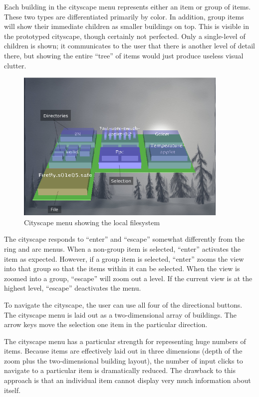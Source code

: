 \documentclass[letterpaper, titlepage, 11pt]{article}
\begin{document}
Each building in the cityscape menu represents either an item or group of
items.  These two types are differentiated primarily by color.  In addition,
group items will show their immediate children as smaller buildings on top.
This is visible in the prototyped cityscape, though certainly not perfected.
Only a single-level of children is shown; it communicates to the user that
there is another level of detail there, but showing the entire ``tree'' of
items would just produce useless visual clutter.

\begin{figure}[htb]
\centering
\includegraphics[width=4in]{figures/city_menu}
\caption{Cityscape menu showing the local filesystem\label{figure:CityscapeMenu}}
\end{figure}

The cityscape responds to ``enter'' and ``escape'' somewhat differently from
the ring and arc menus.  When a non-group item is selected, ``enter'' activates
the item as expected.  However, if a group item is selected, ``enter'' zooms
the view into that group so that the items within it can be selected.  When
the view is zoomed into a group, ``escape'' will zoom out a level.  If the
current view is at the highest level, ``escape'' deactivates the menu.

To navigate the cityscape, the user can use all four of the directional buttons.
The cityscape menu is laid out as a two-dimensional array of buildings.
The arrow keys move the selection one item in the particular direction.

The cityscape menu has a particular strength for representing huge numbers of
items.  Because items are effectively laid out in three dimensions (depth
of the zoom plus the two-dimensional building layout), the number of input
clicks to navigate to a particular item is dramatically reduced.  The drawback
to this approach is that an individual item cannot display very much
information about itself.
\end{document}
